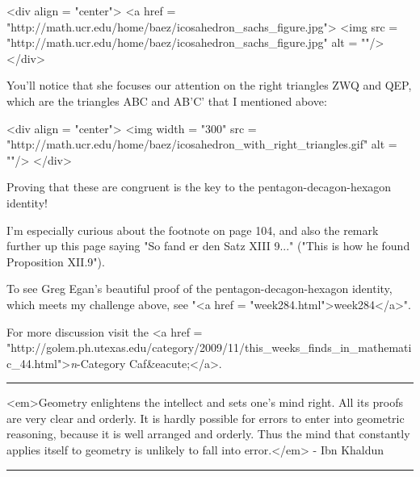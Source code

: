 <div align = "center">
<a href = "http://math.ucr.edu/home/baez/icosahedron_sachs_figure.jpg">
<img src = "http://math.ucr.edu/home/baez/icosahedron_sachs_figure.jpg" alt
= ""/>
</div>

You'll notice that she focuses our attention on the right triangles ZWQ and
QEP, which are the triangles ABC and AB'C' that I mentioned above:

<div align = "center">
<img width = "300" src =
"http://math.ucr.edu/home/baez/icosahedron_with_right_triangles.gif" alt =
""/>
</div>

Proving that these are congruent is the key to the pentagon-decagon-hexagon
identity!

I'm especially curious about the footnote on page 104, and also the remark
further up this page saying "So fand er den Satz XIII 9..." ("This is how
he found Proposition XII.9").

To see Greg Egan's beautiful proof of the pentagon-decagon-hexagon
identity, which meets my challenge above, see "<a href =
"week284.html">week284</a>".

For more discussion visit the <a href =
"http://golem.ph.utexas.edu/category/2009/11/this_weeks_finds_in_mathematic_44.html">\emph{n}-Category
Caf&eacute;</a>.


\par\noindent\rule{\textwidth}{0.4pt}

<em>Geometry enlightens the intellect and sets one's mind right.  All its 
proofs are very clear and orderly.  It is hardly possible for errors to 
enter into geometric reasoning, because it is well arranged and orderly.
Thus the mind that constantly applies itself to geometry is unlikely to
fall into error.</em> - Ibn Khaldun

\par\noindent\rule{\textwidth}{0.4pt}

